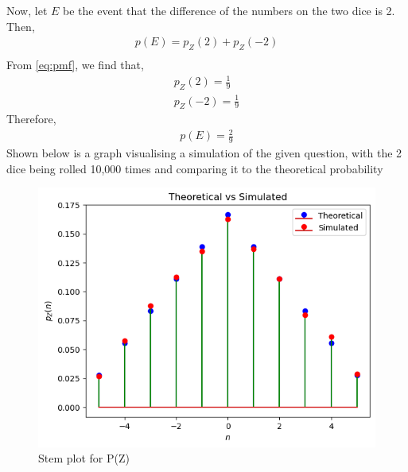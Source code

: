 \documentclass[]{article}
\begin{document}
Now, let $E$ be the event that the difference of the numbers on the two dice is 2. Then,
\begin{align}
  p(E) = p_Z(2) +p_Z(-2)\\
\end{align}
From \eqref{eq:pmf}, we find that,
\begin{align}
  p_Z(2) = \frac{1}{9} \\
  p_Z(-2) = \frac{1}{9}
\end{align}
Therefore,
\begin{align}
  p(E)=\frac{2}{9}
\end{align}
Shown below is a graph visualising a simulation of the given question, with the 2 dice being rolled 10,000 times and comparing it to the theoretical probability
\begin{figure}[h]
  \includegraphics[width=\columnwidth]{./figs/Z.png}
  \caption{Stem plot for P(Z)}
  \label{fig:exemplar/10/13/3/1/Z/}
\end{figure}
\end{document}
